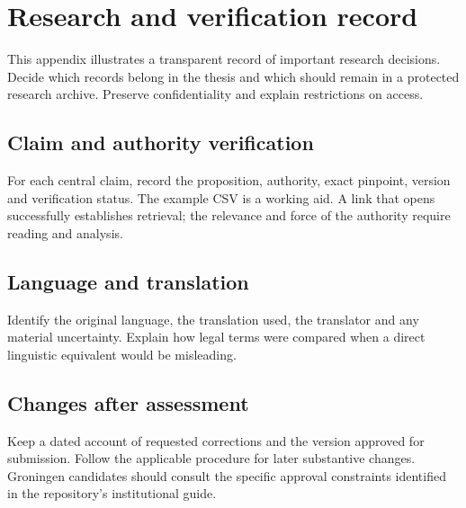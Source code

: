 \chapter{Research and verification record}\label{app:record}
This appendix illustrates a transparent record of important research decisions.
Decide which records belong in the thesis and which should remain in a protected
research archive. Preserve confidentiality and explain restrictions on access.

\section{Claim and authority verification}
For each central claim, record the proposition, authority, exact pinpoint,
version and verification status. The example CSV is a working aid. A link that
opens successfully establishes retrieval; the relevance and force of the
authority require reading and analysis.

\section{Language and translation}
Identify the original language, the translation used, the translator and any
material uncertainty. Explain how legal terms were compared when a direct
linguistic equivalent would be misleading.

\section{Changes after assessment}
Keep a dated account of requested corrections and the version approved for
submission. Follow the applicable procedure for later substantive changes.
Groningen candidates should consult the specific approval constraints identified
in the repository's institutional guide.

